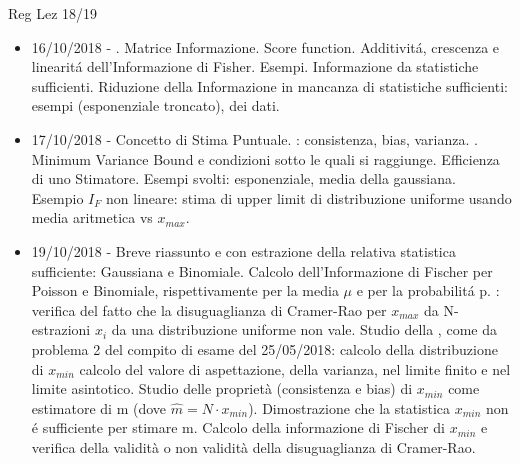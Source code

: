 \begin{frame}[allowframebreaks]{Reg Lez 18/19}
\begin{itemize}
\item 16/10/2018 - . Matrice Informazione. Score function. Additivit\'a, crescenza e linearit\'a dell'Informazione di Fisher. Esempi. Informazione da statistiche sufficienti. Riduzione della Informazione in mancanza di statistiche sufficienti: esempi  (esponenziale troncato),  dei dati.
\item 17/10/2018 - Concetto di Stima Puntuale. : consistenza, bias, varianza. . Minimum Variance Bound e condizioni sotto le quali si raggiunge. Efficienza di uno Stimatore. Esempi svolti: esponenziale, media della gaussiana. Esempio $I_F$ non lineare: stima di upper limit di distribuzione uniforme usando media aritmetica vs $x_{max}$.
\item 19/10/2018 - Breve riassunto e  con estrazione della relativa statistica sufficiente: Gaussiana e Binomiale. Calcolo dell'Informazione di Fischer per Poisson e Binomiale, rispettivamente per la media $\mu$ e per la probabilit\'a p. : verifica del fatto che la disuguaglianza di Cramer-Rao per $x_{max}$ da N-estrazioni $x_i$ da una distribuzione uniforme non vale. Studio della , come da problema 2 del compito di esame del 25/05/2018: calcolo della distribuzione di $x_{min}$ calcolo del valore di aspettazione, della varianza, nel limite finito e nel limite asintotico. Studio delle proprietà (consistenza e bias) di $x_{min}$ come estimatore di m (dove $\hat{m} = N \cdot x_{min}$). Dimostrazione che la statistica $x_{min}$ non \'e sufficiente per stimare m. Calcolo della informazione di Fischer di $x_{min}$ e verifica della validità o non validità della disuguaglianza di Cramer-Rao.


\end{itemize}
\end{frame}
